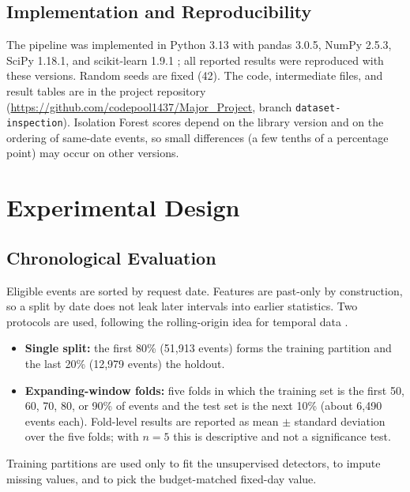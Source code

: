 \documentclass[conference]{IEEEtran}
\begin{document}
\subsection{Implementation and Reproducibility}
The pipeline was implemented in Python 3.13 with pandas 3.0.5, NumPy 2.5.3, SciPy 1.18.1, and scikit-learn 1.9.1 \cite{pedregosa2011}; all reported results were reproduced with these versions. Random seeds are fixed (42). The code, intermediate files, and result tables are in the project repository (\url{https://github.com/codepool1437/Major_Project}, branch \texttt{dataset-inspection}). Isolation Forest scores depend on the library version and on the ordering of same-date events, so small differences (a few tenths of a percentage point) may occur on other versions.

\section{Experimental Design}
\subsection{Chronological Evaluation}
Eligible events are sorted by request date. Features are past-only by construction, so a split by date does not leak later intervals into earlier statistics. Two protocols are used, following the rolling-origin idea for temporal data \cite{bergmeir2012}.
\begin{itemize}
    \item \textbf{Single split:} the first 80\% (51,913 events) forms the training partition and the last 20\% (12,979 events) the holdout.
    \item \textbf{Expanding-window folds:} five folds in which the training set is the first 50, 60, 70, 80, or 90\% of events and the test set is the next 10\% (about 6,490 events each). Fold-level results are reported as mean $\pm$ standard deviation over the five folds; with $n=5$ this is descriptive and not a significance test.
\end{itemize}
Training partitions are used only to fit the unsupervised detectors, to impute missing values, and to pick the budget-matched fixed-day value.
\end{document}

